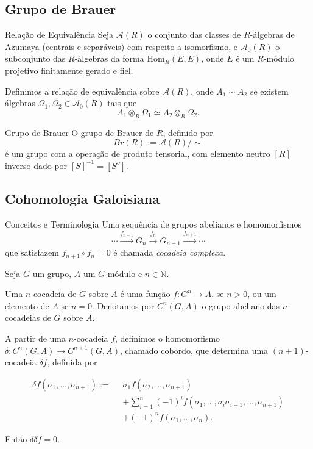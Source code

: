 \documentclass{beamer}
\begin{document}
            \subsection{Grupo de Brauer}
\begin{frame}{Relação de Equivalência}
    Seja $\mathcal{A}(R)$ o conjunto das classes de $R$-álgebras de Azumaya (centrais e separáveis) com respeito a isomorfismo, e $\mathcal{A}_0(R)$ o subconjunto das $R$-álgebras da forma $\text{Hom}_R(E,E)$, onde $E$ é um $R$-módulo projetivo finitamente gerado e fiel.
    
    \vspace{18pt}
    
    Definimos a relação de equivalência sobre $\mathcal{A}(R)$, onde $A_1 \sim A_2$ se existem álgebras $\Omega_1, \Omega_2 \in \mathcal{A}_0(R)$ tais que \[A_1 \otimes_R \Omega_1 \simeq A_2 \otimes_R \Omega_2.\]
\end{frame}
\begin{frame}{Grupo de Brauer}
    O grupo de Brauer de $R$, definido por \[Br(R) := \mathcal{A}(R)/{\sim}\] é um grupo com a operação de produto tensorial, com elemento neutro $[R]$ inverso dado por $[S]^{-1} = [S^o]$.
\end{frame}
            \subsection{Cohomologia Galoisiana}
\begin{frame}{Conceitos e Terminologia}
    Uma sequência de grupos abelianos e homomorfismos 
    \[\cdots \xrightarrow{f_{n-1}} G_n \xrightarrow{f_n} G_{n+1} \xrightarrow{f_{n+1}} \cdots\] que satisfazem $f_{n+1} \circ f_n = 0$ é chamada \emph{cocadeia complexa}.
    
    \vspace{18pt}
    
    Seja $G$ um grupo, $A$ um $G$-módulo e $n\in \mathbb{N}$.
    
    \vspace{18pt}
    
    Uma $n$-cocadeia de $G$ sobre $A$ é uma função $f:G^n\rightarrow A$, se $n>0$, ou um elemento de $A$ se $n = 0$. Denotamos por $C^n(G,A)$ o grupo abeliano das $n$-cocadeias de $G$ sobre $A$.
    
    
\end{frame}

\begin{frame}
    A partir de uma $n$-cocadeia $f$, definimos o homomorfismo $\delta:C^n(G,A)\rightarrow C^{n+1}(G,A)$, chamado cobordo, que determina uma $(n+1)$-cocadeia $\delta f$, definida por 
    
\begin{align*}
    \delta f(\sigma_1,\dots,\sigma_{n+1}) := \;\; &\sigma_1f(\sigma_2,\dots,\sigma_{n+1})\\
    &+ \sum_{i=1}^{n}(-1)^i f(\sigma_1, \dots, \sigma_i\sigma_{i+1},\dots, \sigma_{n+1}) \\
    &+ (-1)^n f(\sigma_1, \dots, \sigma_n).
\end{align*}

Então $\delta\delta f =0$.
\end{frame}
\end{document}
